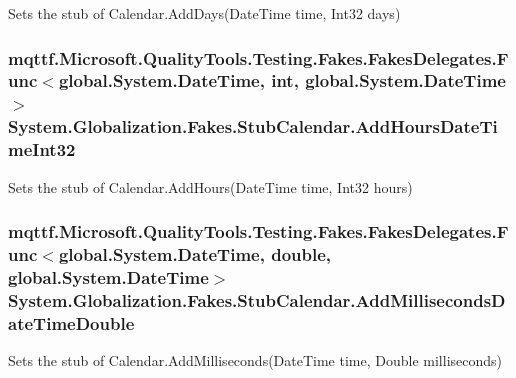 Sets the stub of Calendar.\-Add\-Days(\-Date\-Time time, Int32 days)

\hypertarget{class_system_1_1_globalization_1_1_fakes_1_1_stub_calendar_a575ab45f2fa376a33ae9b26f14a63371}{
\subsubsection[{Add\-Hours\-Date\-Time\-Int32}]{\setlength{\rightskip}{0pt plus 5cm}mqttf.\-Microsoft.\-Quality\-Tools.\-Testing.\-Fakes.\-Fakes\-Delegates.\-Func$<$global.\-System.\-Date\-Time, int, global.\-System.\-Date\-Time$>$ System.\-Globalization.\-Fakes.\-Stub\-Calendar.\-Add\-Hours\-Date\-Time\-Int32}}\label{class_system_1_1_globalization_1_1_fakes_1_1_stub_calendar_a575ab45f2fa376a33ae9b26f14a63371}


Sets the stub of Calendar.\-Add\-Hours(\-Date\-Time time, Int32 hours)

\hypertarget{class_system_1_1_globalization_1_1_fakes_1_1_stub_calendar_a22ad85d9cfb3e11bfec2ab55b354da53}{
\subsubsection[{Add\-Milliseconds\-Date\-Time\-Double}]{\setlength{\rightskip}{0pt plus 5cm}mqttf.\-Microsoft.\-Quality\-Tools.\-Testing.\-Fakes.\-Fakes\-Delegates.\-Func$<$global.\-System.\-Date\-Time, double, global.\-System.\-Date\-Time$>$ System.\-Globalization.\-Fakes.\-Stub\-Calendar.\-Add\-Milliseconds\-Date\-Time\-Double}}\label{class_system_1_1_globalization_1_1_fakes_1_1_stub_calendar_a22ad85d9cfb3e11bfec2ab55b354da53}


Sets the stub of Calendar.\-Add\-Milliseconds(\-Date\-Time time, Double milliseconds)

